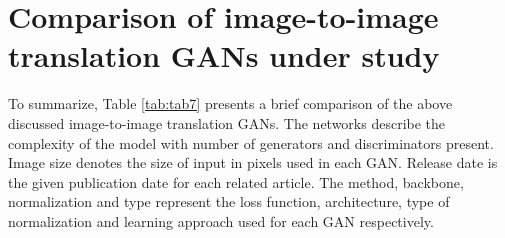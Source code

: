 \section{Comparison of image-to-image translation GANs under study}
	To summarize, Table \ref{tab:tab7} presents a brief comparison of the above discussed image-to-image translation GANs. The networks describe the complexity of the model with number of generators and discriminators present. Image size denotes the size of input in pixels used in each GAN. Release date is the given publication date for each related article. The method, backbone, normalization and type represent the loss function, architecture, type of normalization and learning approach used for each GAN respectively. 
\begin{table}[H]
\end{table}
